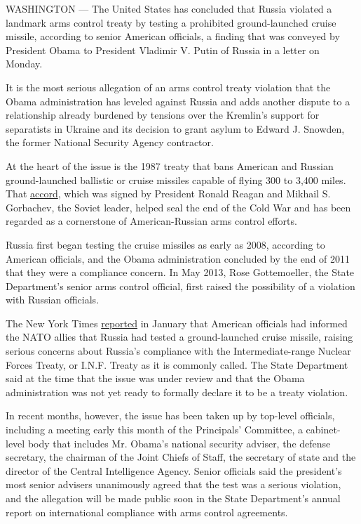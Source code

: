 WASHINGTON --- The United States has concluded that Russia violated a
landmark arms control treaty by testing a prohibited ground-launched
cruise missile, according to senior American officials, a finding that
was conveyed by President Obama to President Vladimir V. Putin of Russia
in a letter on Monday.

It is the most serious allegation of an arms control treaty violation
that the Obama administration has leveled against Russia and adds
another dispute to a relationship already burdened by tensions over the
Kremlin's support for separatists in Ukraine and its decision to grant
asylum to Edward J. Snowden, the former National Security Agency
contractor.

At the heart of the issue is the 1987 treaty that bans American and
Russian ground-launched ballistic or cruise missiles capable of flying
300 to 3,400 miles. That
\href{http://www.state.gov/www/global/arms/treaties/inf1.html}{accord},
which was signed by President Ronald Reagan and Mikhail S. Gorbachev,
the Soviet leader, helped seal the end of the Cold War and has been
regarded as a cornerstone of American-Russian arms control efforts.

Russia first began testing the cruise missiles as early as 2008,
according to American officials, and the Obama administration concluded
by the end of 2011 that they were a compliance concern. In May 2013,
Rose Gottemoeller, the State Department's senior arms control official,
first raised the possibility of a violation with Russian officials.

The New York Times
\href{http://www.nytimes.com/2014/01/30/world/europe/us-says-russia-tested-missile-despite-treaty.html?_r=0}{reported}
in January that American officials had informed the NATO allies that
Russia had tested a ground-launched cruise missile, raising serious
concerns about Russia's compliance with the Intermediate-range Nuclear
Forces Treaty, or I.N.F. Treaty as it is commonly called. The State
Department said at the time that the issue was under review and that the
Obama administration was not yet ready to formally declare it to be a
treaty violation.

In recent months, however, the issue has been taken up by top-level
officials, including a meeting early this month of the Principals'
Committee, a cabinet-level body that includes Mr. Obama's national
security adviser, the defense secretary, the chairman of the Joint
Chiefs of Staff, the secretary of state and the director of the Central
Intelligence Agency. Senior officials said the president's most senior
advisers unanimously agreed that the test was a serious violation, and
the allegation will be made public soon in the State Department's annual
report on international compliance with arms control agreements.

